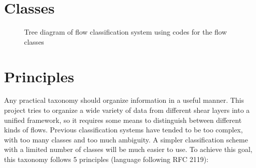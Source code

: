 %

\section{Classes}



\begin{figure}
    \centering
    
    \caption{Tree diagram of flow classification system using codes for the
    flow classes}
\end{figure}

\section{Principles}

Any practical taxonomy should organize information in a useful manner.  This
project tries to organize a wide variety of data from different shear layers
into a unified framework, so it requires some means to distinguish between
different kinds of flows.  Previous classification systems have tended to be
too complex, with too many classes and too much ambiguity.  A simpler
classification scheme with a limited number of classes will be much easier to
use.  To achieve this goal, this taxonomy follows 5 principles (language
following RFC 2119):

